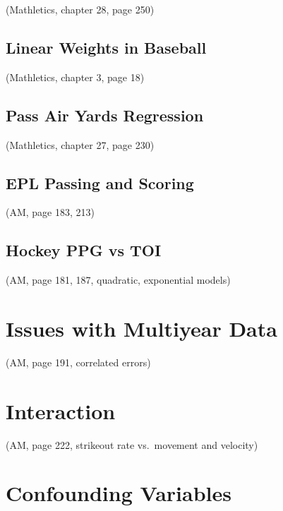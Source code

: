 \documentclass[
  11pt,
]{book}
\theoremstyle{definition}
\theoremstyle{definition}
\theoremstyle{definition}
\theoremstyle{definition}
\theoremstyle{remark}
\begin{document}
(Mathletics, chapter 28, page 250)

\hypertarget{linear-weights-in-baseball}{%
\subsection{Linear Weights in Baseball}\label{linear-weights-in-baseball}}

(Mathletics, chapter 3, page 18)

\hypertarget{pass-air-yards-regression}{%
\subsection{Pass Air Yards Regression}\label{pass-air-yards-regression}}

(Mathletics, chapter 27, page 230)

\hypertarget{epl-passing-and-scoring}{%
\subsection{EPL Passing and Scoring}\label{epl-passing-and-scoring}}

(AM, page 183, 213)

\hypertarget{hockey-ppg-vs-toi}{%
\subsection{Hockey PPG vs TOI}\label{hockey-ppg-vs-toi}}

(AM, page 181, 187, quadratic, exponential models)

\hypertarget{issues-with-multiyear-data}{%
\section{Issues with Multiyear Data}\label{issues-with-multiyear-data}}

(AM, page 191, correlated errors)

\hypertarget{interaction}{%
\section{Interaction}\label{interaction}}

(AM, page 222, strikeout rate vs.~movement and velocity)

\hypertarget{confounding-variables}{%
\section{Confounding Variables}\label{confounding-variables}}
\end{document}
